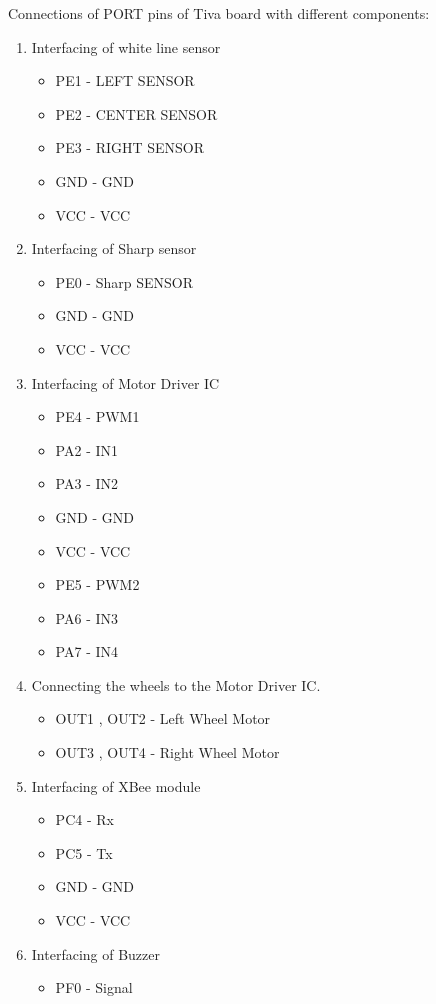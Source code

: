 \documentclass[a4paper,12pt,oneside]{book}
\begin{document}
Connections of PORT pins of Tiva board with different components:\\
\begin {enumerate}
\item Interfacing of white line sensor
\begin{itemize}
\item PE1  - LEFT   SENSOR
\item PE2  - CENTER SENSOR
\item PE3  - RIGHT  SENSOR
\item GND  - GND
\item VCC  - VCC
\end{itemize}
\item Interfacing of Sharp sensor
\begin{itemize}
\item PE0  - Sharp   SENSOR
\item GND  - GND
\item VCC  - VCC
\end{itemize}
\item Interfacing of Motor Driver IC
\begin{itemize}
\item PE4  - PWM1
\item PA2  - IN1
\item PA3  - IN2
\item GND  - GND
\item VCC  - VCC
\item PE5  - PWM2
\item PA6  - IN3
\item PA7  - IN4
\end{itemize}
\item Connecting the wheels to the Motor Driver IC.
\begin{itemize}
\item OUT1 , OUT2 - Left Wheel Motor
\item OUT3 , OUT4 - Right Wheel Motor
\end{itemize} 
\newpage
\item Interfacing of XBee module
\begin{itemize}
\item PC4  - Rx
\item PC5  - Tx
\item GND  - GND
\item VCC  - VCC
\end{itemize}
\item Interfacing of Buzzer
\begin{itemize}
\item PF0  - Signal

\end{itemize}
\end{enumerate}
\end{document}
